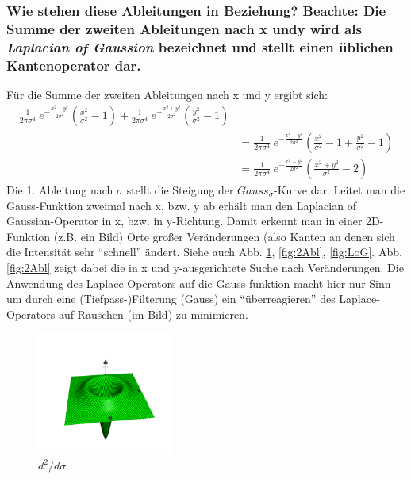 \subsubsection*{Wie stehen diese Ableitungen in Beziehung? Beachte: Die Summe der zweiten Ableitungen nach x undy wird als \emph{Laplacian of Gaussion} bezeichnet und stellt einen \"ublichen Kantenoperator dar.}

F\"ur die Summe der zweiten Ableitungen nach x und y ergibt sich:
\begin{align*}
\frac{1}{2 \pi \sigma^4}~e^{-\frac{x^2 + y^2}{2 \sigma^2}} (\frac{x^2}{\sigma^2} - 1) + \frac{1}{2 \pi \sigma^4}~e^{-\frac{x^2 + y^2}{2 \sigma^2}} (\frac{y^2}{\sigma^2} - 1)\\
&= \frac{1}{2 \pi \sigma^4}~e^{-\frac{x^2 + y^2}{2 \sigma^2}} (\frac{x^2}{\sigma^2} - 1 + \frac{y^2}{\sigma^2} - 1)\\
&= \frac{1}{2 \pi \sigma^4}~e^{-\frac{x^2 + y^2}{2 \sigma^2}} (\frac{x^2 + y^2}{\sigma^2} - 2)
\end{align*}
Die 1. Ableitung nach $\sigma$ stellt die Steigung der $Gauss_{\sigma}$-Kurve dar. Leitet man die Gauss-Funktion zweimal nach x, bzw. y ab erh\"alt man den Laplacian of Gaussian-Operator in x, bzw. in y-Richtung.
Damit erkennt man in einer 2D-Funktion (z.B. ein Bild) Orte gro{\ss}er Ver\"anderungen (also Kanten an denen sich die Intensit\"at sehr ``schnell'' \"andert.
Siehe auch Abb. \ref{fig:1Abl}, \ref{fig:2Abl}, \ref{fig:LoG}.
Abb. \ref{fig:2Abl} zeigt dabei die in x und y-ausgerichtete Suche nach Ver\"anderungen. Die Anwendung des  Laplace-Operators auf die Gauss-funktion macht hier nur Sinn um durch eine (Tiefpass-)Filterung (Gauss) ein ``\"uberreagieren'' des Laplace-Operators auf Rauschen (im Bild) zu minimieren.

\begin{figure}[p] %
   \centering
   \includegraphics[width=0.4\textwidth]{Uebung6/1Abl_sigma.pdf} 
   \caption{$d^{2}/d\sigma$}
   \label{fig:1Abl}
\end{figure}

